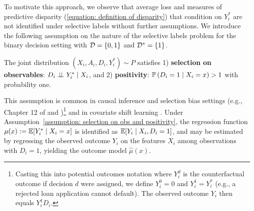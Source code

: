 \documentclass{article}
\begin{document}
To motivate this approach, we observe that average loss and measures of predictive disparity (\ref{equation: definition of disparity}) that condition on $Y_i^*$ are not identified under selective labels without further assumptions. %
We introduce the following assumption on the nature of the selective labels problem for the binary decision setting with $\mathcal{D} = \{0, 1\}$ and $\mathcal{D}^* = \{1\}$. 
\begin{assumption}\label{assumption: selection on obs and positivity}
    The joint distribution $(X_i, A_i, D_i, Y_i^*) \sim P$ satisfies 1) \textbf{selection on observables}: $D_i \perp \!\!\!\perp Y_i^* \mid X_i$, and 2) \textbf{positivity}: $\mathbb{P}\left(D_i = 1 \mid X_i = x\right) > 1$ with probability one.
\end{assumption}
This assumption is common in causal inference and selection bias settings (e.g., Chapter 12 of \cite{ImbensRubin(15)} and \cite{Heckman(90)})\footnote{Casting this into potential outcomes notation where $Y_i^{d}$ is the counterfactual outcome if decision $d$ were assigned, we define $Y^{0}_i = 0$ and $Y_i^{1} = Y_i^*$ (e.g., a rejected loan application cannot default). The observed outcome $Y_i$ then equals $Y^{1}_i D_i$.} and in covariate shift learning  \cite{moreno2012unifying}.
Under Assumption~\ref{assumption: selection on obs and positivity}, the regression function $\mu(x) := \mathbb{E}[Y_i^* \mid X_i = x]$ is identified as $\mathbb{E}[Y_i \mid X_i, D_i = 1]$, and may be estimated by regressing the observed outcome $Y_i$ on the features $X_i$ among observations with $D_i = 1$, yielding the outcome model $\hat{\mu}(x)$.
\end{document}
